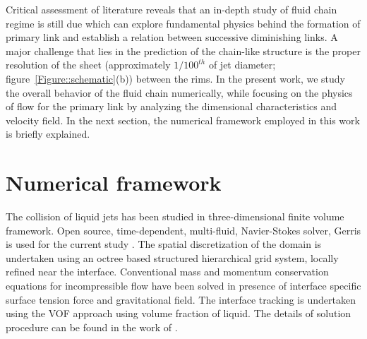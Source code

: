 \documentclass{jfm}
\begin{document}
Critical assessment of literature reveals that an in-depth study of fluid chain regime is still due which can explore fundamental physics behind the formation of primary link and establish a relation between successive diminishing links. A major challenge that lies in the prediction of the chain-like structure is the proper resolution of the sheet (approximately $1/100^{th}$ of jet diameter; figure~\ref{Figure::schematic}(b)) between the rims. In the present work, we study the overall behavior of the fluid chain numerically, while focusing on the physics of flow for the primary link by analyzing the dimensional characteristics and velocity field. In the next section, the numerical framework employed in this work is briefly explained.
\section{Numerical framework}
The collision of liquid jets has been studied in three-dimensional finite volume framework. Open source, time-dependent, multi-fluid, Navier-Stokes solver, Gerris is used for the current study \citep{popinet2009}. The spatial discretization of the domain is undertaken using an octree based structured hierarchical grid system, locally refined near the interface. Conventional mass and momentum conservation equations for incompressible flow have been solved in presence of interface specific surface tension force and gravitational field. The interface tracking is undertaken using the VOF approach using volume fraction of liquid. The details of solution procedure can be found in the work of \cite{popinet2009}.\\
\end{document}
